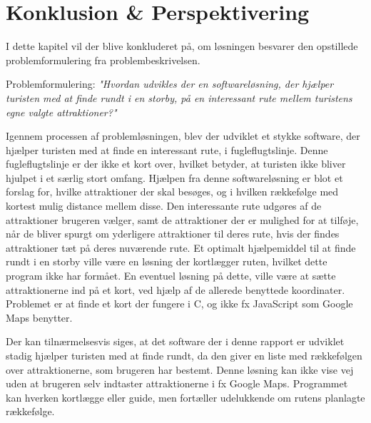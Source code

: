 \chapter{Konklusion \& Perspektivering}
I dette kapitel vil der blive konkluderet på, om løsningen besvarer den opstillede problemformulering fra problembeskrivelsen.

Problemformulering:\newline
\textit{"Hvordan udvikles der en softwareløsning, der hjælper turisten med at finde rundt i en storby, på en interessant rute mellem turistens egne valgte attraktioner?"}

Igennem processen af problemløsningen, blev der udviklet et stykke software, der hjælper turisten med at finde en interessant rute, i fugleflugtslinje. Denne fugleflugtslinje er der ikke et kort over, hvilket betyder, at turisten ikke bliver hjulpet i et særlig stort omfang. Hjælpen fra denne softwareløsning er blot et forslag for, hvilke attraktioner der skal besøges, og i hvilken rækkefølge med kortest mulig distance mellem disse. Den interessante rute udgøres af de attraktioner brugeren vælger, samt de attraktioner der er mulighed for at tilføje, når de bliver spurgt om yderligere attraktioner til deres rute, hvis der findes attraktioner tæt på deres nuværende rute.\newline
Et optimalt hjælpemiddel til at finde rundt i en storby ville være en løsning der kortlægger ruten, hvilket dette program ikke har formået. En eventuel løsning på dette, ville være at sætte attraktionerne ind på et kort, ved hjælp af de allerede benyttede koordinater. Problemet er at finde et kort der fungere i C, og ikke fx JavaScript som Google Maps benytter.

Der kan tilnærmelsesvis siges, at det software der i denne rapport er udviklet stadig hjælper turisten med at finde rundt, da den giver en liste med rækkefølgen over attraktionerne, som brugeren har bestemt. Denne løsning kan ikke vise vej uden at brugeren selv indtaster attraktionerne i fx Google Maps. Programmet kan hverken kortlægge eller guide, men fortæller udelukkende om rutens planlagte rækkefølge.

